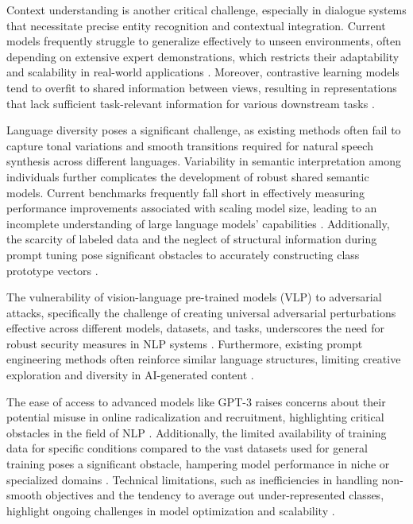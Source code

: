 Context understanding is another critical challenge, especially in dialogue systems that necessitate precise entity recognition and contextual integration. Current models frequently struggle to generalize effectively to unseen environments, often depending on extensive expert demonstrations, which restricts their adaptability and scalability in real-world applications \cite{alayrac2022flamingo}. Moreover, contrastive learning models tend to overfit to shared information between views, resulting in representations that lack sufficient task-relevant information for various downstream tasks \cite{wang2022rethinkingminimalsufficientrepresentation}.



Language diversity poses a significant challenge, as existing methods often fail to capture tonal variations and smooth transitions required for natural speech synthesis across different languages. Variability in semantic interpretation among individuals further complicates the development of robust shared semantic models. Current benchmarks frequently fall short in effectively measuring performance improvements associated with scaling model size, leading to an incomplete understanding of large language models' capabilities \cite{chowdhery2023palm}. Additionally, the scarcity of labeled data and the neglect of structural information during prompt tuning pose significant obstacles to accurately constructing class prototype vectors \cite{ge2024psppretrainingstructureprompt}.



The vulnerability of vision-language pre-trained models (VLP) to adversarial attacks, specifically the challenge of creating universal adversarial perturbations effective across different models, datasets, and tasks, underscores the need for robust security measures in NLP systems \cite{zhang2024universaladversarialperturbationsvisionlanguage}. Furthermore, existing prompt engineering methods often reinforce similar language structures, limiting creative exploration and diversity in AI-generated content \cite{palmini2024patternscreativityuserinput}.



The ease of access to advanced models like GPT-3 raises concerns about their potential misuse in online radicalization and recruitment, highlighting critical obstacles in the field of NLP \cite{mcguffie2020radicalizationrisksgpt3advanced}. Additionally, the limited availability of training data for specific conditions compared to the vast datasets used for general training poses a significant obstacle, hampering model performance in niche or specialized domains \cite{ginzburg2021selfsuperviseddocumentsimilarityranking}. Technical limitations, such as inefficiencies in handling non-smooth objectives and the tendency to average out under-represented classes, highlight ongoing challenges in model optimization and scalability \cite{peiris2021deeplearningnonsmoothobjectives}.



